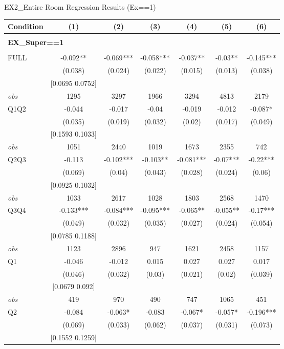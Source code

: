 \begin{table}[]
\TABLE
{EX2\_Entire Room Regression Results (Ex==1) \label{ex2_result_detail1}}{\begin{tabular}{lcccccc}
\hline
Condition & (1) & (2) & (3) & (4) & (5) & (6) \\ \hline
\\ 
\multicolumn{5}{l}{\textbf{EX\_Super==1}} \\ 
\\ 
FULL & -0.092** & -0.069*** & -0.058*** & -0.037** & -0.03** & -0.145*** \\ 
&(0.038)&(0.024) & (0.022)&(0.015)&(0.013)&(0.038)\\ 
& [0.0695 0.0752] & & & & & \\ 
\textit{obs} & 1295 & 3297 & 1966 & 3294 & 4813 & 2179 \\ 
Q1Q2 & -0.044 & -0.017 & -0.04 & -0.019 & -0.012 & -0.087* \\ 
&(0.035)&(0.019) & (0.032)&(0.02)&(0.017)&(0.049)\\ 
& [0.1593 0.1033] & & & & & \\ 
\textit{obs} & 1051 & 2440 & 1019 & 1673 & 2355 & 742 \\ 
Q2Q3 & -0.113 & -0.102*** & -0.103** & -0.081*** & -0.07*** & -0.22*** \\ 
&(0.069)&(0.04) & (0.043)&(0.028)&(0.024)&(0.06)\\ 
& [0.0925 0.1032] & & & & & \\ 
\textit{obs} & 1033 & 2617 & 1028 & 1803 & 2568 & 1470 \\ 
Q3Q4 & -0.133*** & -0.084*** & -0.095*** & -0.065** & -0.055** & -0.17*** \\ 
&(0.049)&(0.032) & (0.035)&(0.027)&(0.024)&(0.054)\\ 
& [0.0785 0.1188] & & & & & \\ 
\textit{obs} & 1123 & 2896 & 947 & 1621 & 2458 & 1157 \\ 
Q1 & -0.046 & -0.012 & 0.015 & 0.027 & 0.027 & 0.017 \\ 
&(0.046)&(0.032) & (0.03)&(0.021)&(0.02)&(0.039)\\ 
& [0.0679 0.092] & & & & & \\ 
\textit{obs} & 419 & 970 & 490 & 747 & 1065 & 451 \\ 
Q2 & -0.084 & -0.063* & -0.083 & -0.067* & -0.057* & -0.196*** \\ 
&(0.069)&(0.033) & (0.062)&(0.037)&(0.031)&(0.073)\\ 
& [0.1552 0.1259] & & & & & \\ 

\end{tabular}}
\end{table}
